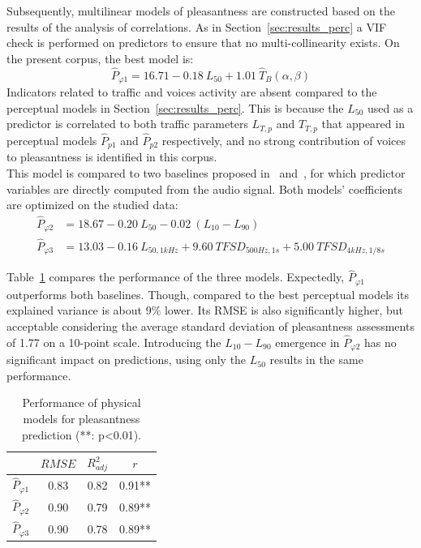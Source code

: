 \documentclass[11pt,a4paper]{article}
\begin{document}
Subsequently, multilinear models of pleasantness are constructed based on the results of the analysis of correlations. As in Section~\ref{sec:results_perc} a VIF check is performed on predictors to ensure that no multi-collinearity exists. On the present corpus, the best model is:
\begin{equation}
\hat P_{\varphi 1} = 16.71 - 0.18~L_{50} + 1.01~\hat T_B(\alpha, \beta)
\end{equation}
Indicators related to traffic and voices activity are absent compared to the perceptual models in Section~\ref{sec:results_perc}. This is because the $L_{50}$ used as a predictor is correlated to both traffic parameters $L_{T, p}$ and $T_{T, p}$ that appeared in perceptual models $\hat P_{p1}$ and $\hat P_{p2}$ respectively, and no strong contribution of voices to pleasantness is identified in this corpus.\\

This model is compared to two baselines proposed in~\cite{ricciardi2014} and~\cite{aumond2017}, for which predictor variables are directly computed from the audio signal. Both models' coefficients are optimized on the studied data:
\begin{align}
\hat P_{\varphi 2} &= 18.67 - 0.20~L_{50} - 0.02~(L_{10}-L_{90})\\
\hat P_{\varphi 3} &= 13.03 - 0.16~L_{50, 1kHz} + 9.60~TFSD_{500Hz, 1s} + 5.00~TFSD_{4kHz, 1/8s}
\end{align}

Table~\ref{tab:physm} compares the performance of the three models. Expectedly, $\hat P_{\varphi 1}$ outperforms both baselines. Though, compared to the best perceptual models its explained variance is about 9\% lower. Its RMSE is also significantly higher, but acceptable considering the average standard deviation of pleasantness assessments of 1.77 on a 10-point scale. Introducing the $L_{10}-L_{90}$ emergence in $\hat P_{\varphi 2}$ has no significant impact on predictions, using only the $L_{50}$ results in the same performance.\\

\begin{table}[t]
\centering
\caption{Performance of physical models for pleasantness prediction (**: p<0.01).}
\label{tab:physm}
\begin{tabular}{ c | c | c | c }
\hline
	 & $RMSE$ & $R^2_{adj}$ & $r$ \\ \hline
	$\hat P_{\varphi 1}$ & 0.83 & 0.82 & 0.91** \\
	$\hat P_{\varphi 2}$ & 0.90 & 0.79 & 0.89** \\
	$\hat P_{\varphi 3}$ & 0.90 & 0.78 & 0.89** \\ \hline
\end{tabular}
\end{table}
\end{document}
